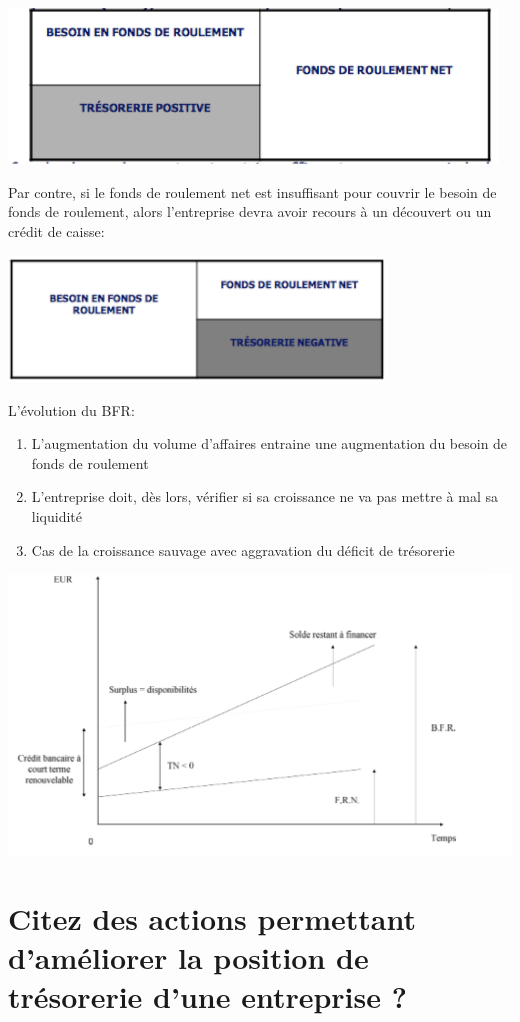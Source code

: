 \documentclass{article}
\begin{document}
\includegraphics[width=13cm]{c9.png}

Par contre, si le fonds de roulement net est insuffisant pour couvrir le besoin de fonds de roulement, alors l'entreprise devra avoir recours à un découvert ou un crédit de caisse:

\includegraphics[width=10cm]{c8.png}

L'évolution du BFR:

\begin{enumerate}
	\item L'augmentation du volume d'affaires entraine une augmentation du besoin de fonds de roulement
	\item L'entreprise doit, dès lors, vérifier si sa croissance ne va  pas mettre à mal sa liquidité
	\item Cas de la croissance sauvage avec aggravation du déficit de trésorerie
\end{enumerate}

\includegraphics[width=12 cm]{c3.png}

\section{Citez des actions permettant d'améliorer la position de trésorerie d'une entreprise ?}
\end{document}
